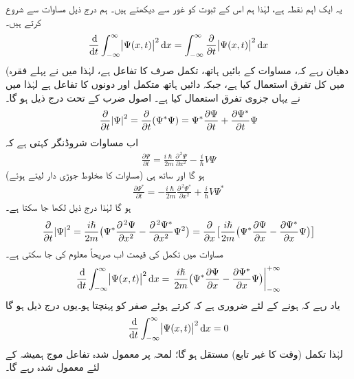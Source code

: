  یہ ایک اہم نقطہ ہے، لہٰذا ہم اس کے ثبوت کو غور سے دیکھتے ہیں۔ ہم درج ذیل مساوات سے شروع کرتے ہیں۔
\begin{align}\label{مساوات_تفاعل_موج_الف}
\frac{\dif}{\dif t} \int_{-\infty}^{\infty} \abs{ \Psi (x , t)}^2 \dif x = \int_{- \infty}^{\infty} \frac{ \partial}{\partial t} \abs{ \Psi (x , t)}^2 \dif x 
\end{align}
(دھیان رہے کہ، مساوات کے بائیں ہاتھ، تکمل صرف  کا تفاعل ہے، لہٰذا میں نے پہلے فقرہ میں کل تفرق  استعمال کیا ہے، جبکہ دائیں ہاتھ متکمل  اور  دونوں کا تفاعل ہے لہٰذا میں نے یہاں جزوی تفرق  استعمال کیا ہے۔ اصول ضرب کے تحت درج ذیل ہو گا۔
\begin{align}
\frac{\partial}{\partial t}\abs{\Psi}^2=\frac{\partial}{\partial t}(\Psi^*\Psi)=\Psi^*\frac{\partial \Psi}{\partial t}+\frac{\partial \Psi^*}{\partial t}\Psi
\end{align}
اب مساوات شروڈنگر کہتی ہے کہ 
\begin{align}\label{مساوات_تفاعل_موج_شروڈنگر_تفرق_الف}
\frac{\partial \Psi}{\partial t}=\frac{i\hslash}{2m}\frac{\partial^{\,2}\Psi}{\partial x^2}-\frac{i}{\hslash}V\Psi
\end{align}
ہو گا اور ساتھ ہی (مساوات  کا مخلوط جوڑی دار لیتے ہوئے) 
\begin{align}\label{مساوات_تفاعل_موج_آخر}
\frac{\partial \Psi^*}{\partial t}=-\frac{i\hslash}{2m}\frac{\partial^{\,2}\Psi^*}{\partial x^2}+\frac{i}{\hslash}V\Psi^*
\end{align}
ہو گا لہٰذا درج ذیل لکھا جا سکتا ہے۔
\begin{align}\label{مساوات_تفاعل_موج_صریحاً_تکمل_الف}
\frac{\partial}{\partial t}\abs{\Psi}^2=\frac{i\hslash}{2m}\big(\Psi^*\frac{\partial^{\,2} \Psi}{\partial x^2}-\frac{\partial^{\,2}\Psi^*}{\partial x^2}\Psi^2\big)=\frac{\partial}{\partial x}\big[\frac{i\hslash}{2m}\big(\Psi^*\frac{\partial \Psi}{\partial x}-\frac{\partial \Psi^*}{\partial x}\Psi\big)\big]
\end{align}
مساوات  میں تکمل کی قیمت اب صریحاً معلوم کی جا سکتی ہے۔
\begin{align}
\frac{\dif}{\dif t}\int_{-\infty}^{\infty}\abs{\Psi(x,t)}^2\dif x=\left .\frac{i\hslash}{2m}\big(\Psi^*\frac{\partial \Psi}{\partial x}-\frac{\partial \Psi^*}{\partial x}\Psi\big)\right\vert_{-\infty}^{+\infty}
\end{align}
یاد رہے کہ  ہونے کے لئے ضروری ہے کہ  کرتے ہوئے  صفر کو پہنچتا ہو۔یوں درج ذیل ہو گا
\begin{align}\label{مساوات_تفاعل_موج_تکمل_مستقل_ہو_گا}
\frac{\dif}{\dif t}\int_{-\infty}^{\infty}\abs{\Psi(x,t)}^2\dif x=0
\end{align}
لہٰذا تکمل (وقت کا غیر تابع) مستقل ہو گا؛ لمحہ  پر معمول شدہ تفاعل موج ہمیشہ کے لئے معمول شدہ رہے گا۔

